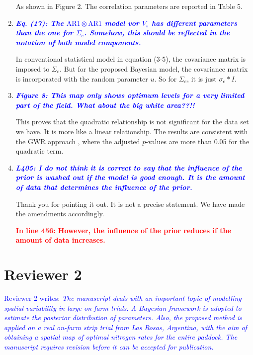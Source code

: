 \documentclass[a4paper]{article}   	%
\newcommand{\AR}{\mathrm{AR}1}
\newcommand{\qtitle}[1]{\textit{\textbf{#1}}}
\begin{document}
\begin{enumerate}
    As shown in Figure 2. The correlation parameters are reported in Table 5.
     

    \item \qtitle{\textcolor{blue}{Eq. (17): The $\AR\otimes \AR$ model vor $V_s$ has different parameters than the one for $\Sigma_e$. Somehow, this should be reflected in the notation of both model components.}}

    In conventional statistical model in equation (3-5), the covariance matrix is imposed to $\Sigma_e$. But for the proposed Bayesian model, the covariance matrix is incorporated with the random parameter $u$. So for $\Sigma_e$, it is just $\sigma_e*I$. 

    \item \qtitle{\textcolor{blue}{Figure 8: This map only shows optimum levels for a very limited part of the field. What about the big white area??!!}}

    This proves that the quadratic relationship is not significant for the data set we have. It is more like a linear relationship. The results are consistent with the GWR approach \parencite{Rakshit2020Novel}, where the adjusted $p$-values are more than 0.05 for the quadratic term.

    \item \qtitle{\textcolor{blue}{L405: I do not think it is correct to say that the influence of the prior is washed out if the model is good enough. It is the amount of data that determines the influence of the prior.}}
    
    Thank you for pointing it out. It is not a precise statement. We have made the amendments accordingly. 
    
    \textcolor{red}{\textbf{In line 456: However, the influence of the prior reduces if the amount of data increases.}}
    
\end{enumerate}





\section*{Reviewer 2}

\textcolor{blue}{Reviewer 2 writes}:
\textit{\textcolor{blue}{The manuscript deals with an important topic of modelling spatial variability in large on-farm trials. A Bayesian framework is adopted to estimate the posterior distribution of parameters. Also, the proposed method is applied on a real on-farm strip trial from Las Rosas, Argentina, with the aim of obtaining a spatial map of optimal nitrogen rates for the entire paddock. The manuscript requires revision before it can be accepted for publication.}}
\end{document}
